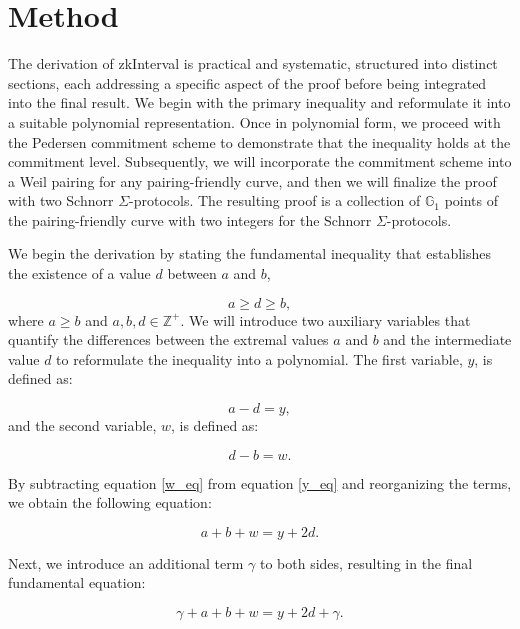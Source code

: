 \documentclass[version=preprint]{iacrcc}
\begin{document}
\section{Method}

The derivation of zkInterval is practical and systematic, structured into distinct sections, each addressing a specific aspect of the proof before being integrated into the final result. We begin with the primary inequality and reformulate it into a suitable polynomial representation. Once in polynomial form, we proceed with the Pedersen commitment scheme to demonstrate that the inequality holds at the commitment level. Subsequently, we will incorporate the commitment scheme into a Weil pairing for any pairing-friendly curve, and then we will finalize the proof with two Schnorr $\Sigma$-protocols. The resulting proof is a collection of \(\mathbb{G}_{1}\) points of the pairing-friendly curve with two integers for the Schnorr $\Sigma$-protocols.

We begin the derivation by stating the fundamental inequality that establishes the existence of a value $d$ between $a$ and $b$,

\begin{equation}
a \geq d \geq b,
\end{equation}
where \( a \geq b \) and \( a, b, d \in \mathbb{Z}^+ \). We will introduce two auxiliary variables that quantify the differences between the extremal values \(a\) and \(b\) and the intermediate value \(d\) to reformulate the inequality into a polynomial. The first variable, \( y \), is defined as:

\begin{equation}
\label{y_eq}
a - d = y,
\end{equation}
and the second variable, \( w \), is defined as:

\begin{equation}
\label{w_eq}
d - b = w.
\end{equation}

By subtracting equation \ref{w_eq} from equation \ref{y_eq} and reorganizing the terms, we obtain the following equation:

\begin{equation}
\label{half_eq}
a + b + w = y + 2d.
\end{equation}

Next, we introduce an additional term \( \gamma \) to both sides, resulting in the final fundamental equation:

\begin{equation}
\label{full_eq}
\gamma + a + b + w = y + 2d + \gamma.
\end{equation}
\end{document}
